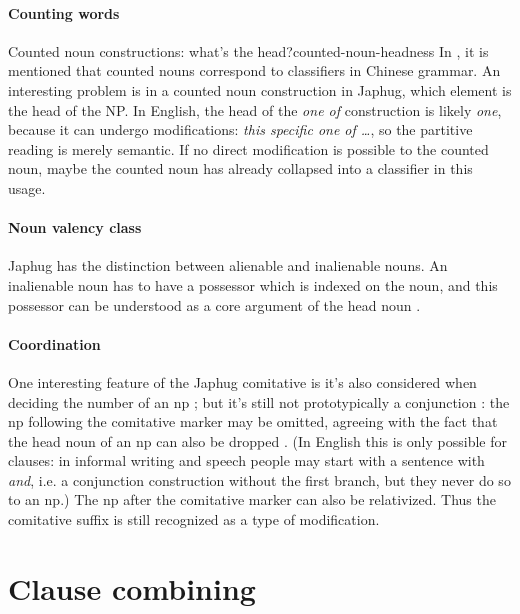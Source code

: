 \documentclass[a4paper, oneside, 12pt]{report}
\newcommand*{\citepage}[1]{p.~{#1}}
\newcommand{\form}[1]{\emph{#1}}
\begin{document}
\paragraph*{Counting words}

\begin{todobox}{Counted noun constructions: what's the head?}{counted-noun-headness}
    In \citet[\citepage{10}]{jacques2021grammar},
    it is mentioned that counted nouns correspond to classifiers in Chinese grammar.
    An interesting problem is in a counted noun construction in Japhug,
    which element is the head of the NP.
    In English, the head of the \form{one of} construction is likely \form{one},
    because it can undergo modifications:
    \form{this specific one of \dots},
    so the partitive reading is merely semantic.
    If no direct modification is possible to the counted noun,
    maybe the counted noun has already collapsed into a classifier in this usage.
\end{todobox}

\paragraph*{Noun valency class}
Japhug has the distinction between alienable and inalienable nouns.
An inalienable noun has to have a possessor
which is indexed on the noun,
and this possessor can be understood as a core argument of the head noun
\citep[\citepage{116}]{jacques2021grammar}.

\paragraph*{Coordination}
One interesting feature of the Japhug comitative 
is it's also considered when deciding the number of an \acs{np}
\citep[\citepage{332}]{jacques2021grammar};
but it's still not prototypically a conjunction \citep[\citepage{420}]{jacques2021grammar}:
the \acs{np} following the comitative marker 
may be omitted, 
agreeing with the fact 
that the head noun of an \acs{np}
can also be dropped \citep[\citepage{425}]{jacques2021grammar}.
(In English this is only possible for clauses:
in informal writing and speech people may start with a sentence with \form{and},
i.e. a conjunction construction 
without the first branch,
but they never do so to an \acs{np}.)
The \acs{np} after the comitative marker can also be relativized.
Thus the comitative suffix is still recognized as a type of 
modification.

\section{Clause combining}
\end{document}
